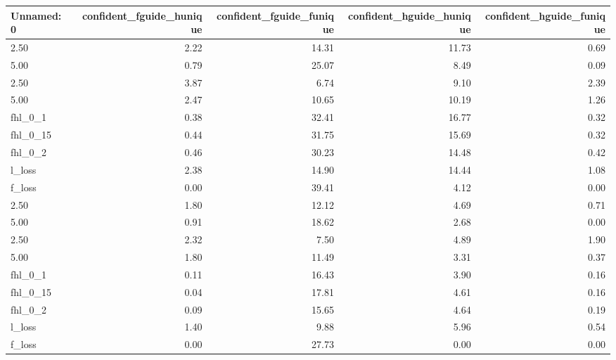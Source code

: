\begin{tabular}{lrrrr}
\toprule
Unnamed: 0 & confident_fguide_hunique & confident_fguide_funique & confident_hguide_hunique & confident_hguide_funique \\
\midrule
2.50 & 2.22 & 14.31 & 11.73 & 0.69 \\
5.00 & 0.79 & 25.07 & 8.49 & 0.09 \\
2.50 & 3.87 & 6.74 & 9.10 & 2.39 \\
5.00 & 2.47 & 10.65 & 10.19 & 1.26 \\
fhl_0_1 & 0.38 & 32.41 & 16.77 & 0.32 \\
fhl_0_15 & 0.44 & 31.75 & 15.69 & 0.32 \\
fhl_0_2 & 0.46 & 30.23 & 14.48 & 0.42 \\
l_loss & 2.38 & 14.90 & 14.44 & 1.08 \\
f_loss & 0.00 & 39.41 & 4.12 & 0.00 \\
2.50 & 1.80 & 12.12 & 4.69 & 0.71 \\
5.00 & 0.91 & 18.62 & 2.68 & 0.00 \\
2.50 & 2.32 & 7.50 & 4.89 & 1.90 \\
5.00 & 1.80 & 11.49 & 3.31 & 0.37 \\
fhl_0_1 & 0.11 & 16.43 & 3.90 & 0.16 \\
fhl_0_15 & 0.04 & 17.81 & 4.61 & 0.16 \\
fhl_0_2 & 0.09 & 15.65 & 4.64 & 0.19 \\
l_loss & 1.40 & 9.88 & 5.96 & 0.54 \\
f_loss & 0.00 & 27.73 & 0.00 & 0.00 \\
\bottomrule
\end{tabular}
